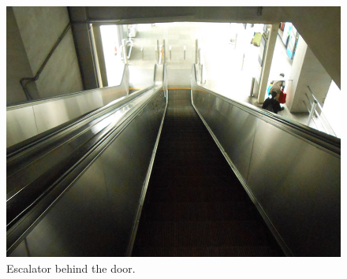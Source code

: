 \documentclass[11pt]{article}
\begin{document}
 \begin{figure}[!h]
    \centering
    	\includegraphics{image016.jpg}
    	\caption{Escalator behind the door.\label{pic6}}
 \end{figure}
\end{document}
